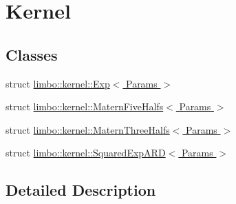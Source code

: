 \hypertarget{group__kernel}{}\section{Kernel}
\label{group__kernel}
\subsection*{Classes}
\begin{DoxyCompactItemize}
\item 
struct \hyperlink{structlimbo_1_1kernel_1_1_exp}{limbo\+::kernel\+::\+Exp$<$ Params $>$}
\item 
struct \hyperlink{structlimbo_1_1kernel_1_1_matern_five_halfs}{limbo\+::kernel\+::\+Matern\+Five\+Halfs$<$ Params $>$}
\item 
struct \hyperlink{structlimbo_1_1kernel_1_1_matern_three_halfs}{limbo\+::kernel\+::\+Matern\+Three\+Halfs$<$ Params $>$}
\item 
struct \hyperlink{structlimbo_1_1kernel_1_1_squared_exp_a_r_d}{limbo\+::kernel\+::\+Squared\+Exp\+A\+R\+D$<$ Params $>$}
\end{DoxyCompactItemize}


\subsection{Detailed Description}
